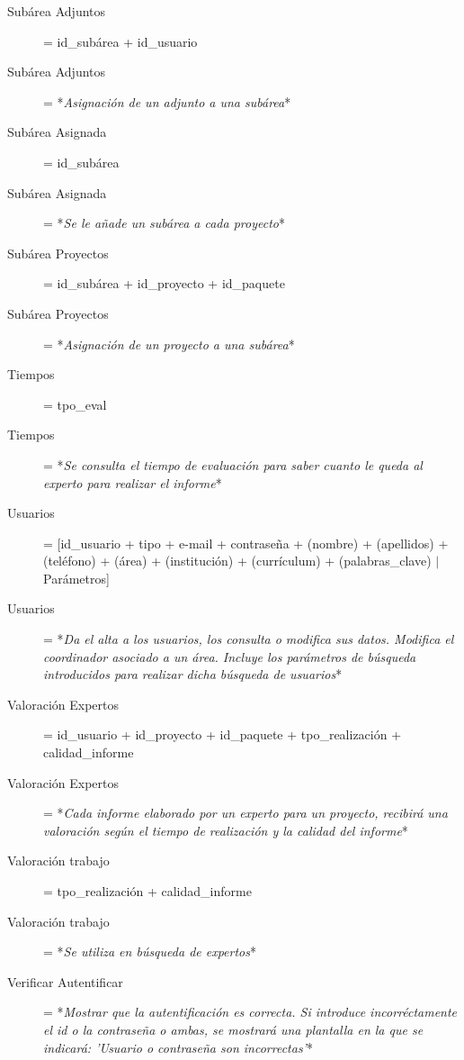 \documentclass[12pt,a4paper,spanish,twoside]{book}
\begin{document}
\begin{description}
\item[Subárea Adjuntos] = id\_subárea + id\_usuario

\item[Subárea Adjuntos] = *\emph{Asignación de un adjunto a una subárea}*

\item[Subárea Asignada] = id\_subárea

\item[Subárea Asignada] = *\emph{Se le añade un subárea a cada proyecto}*

\item[Subárea Proyectos] = id\_subárea + id\_proyecto + id\_paquete

\item[Subárea Proyectos] = *\emph{Asignación de un proyecto a una subárea}*

\item[Tiempos] = tpo\_eval

\item[Tiempos] = *\emph{Se consulta el tiempo de evaluación para saber cuanto
    le queda al experto para realizar el informe}* 

\item[Usuarios] = [id\_usuario + tipo + e-mail + contraseña + (nombre) +
  (apellidos) + (teléfono) + (área) + (institución) + (currículum) +
  (palabras\_clave) $\mid$ Parámetros] 

\item[Usuarios] = *\emph{Da el alta a los usuarios, los consulta o modifica
    sus datos. Modifica el coordinador asociado a un área. Incluye los
    parámetros de búsqueda introducidos para realizar dicha búsqueda de
    usuarios}* 

\item[Valoración Expertos] = id\_usuario + id\_proyecto + id\_paquete +
  tpo\_realización + calidad\_informe 

\item[Valoración Expertos] = *\emph{Cada informe elaborado por un experto
    para un proyecto, recibirá una valoración según el tiempo de realización
    y la calidad del informe}* 

\item[Valoración trabajo] = {tpo\_realización + calidad\_informe}

\item[Valoración trabajo] = *\emph{Se utiliza en búsqueda de expertos}*

\item[Verificar Autentificar] = *\emph{Mostrar que la autentificación es
    correcta. Si introduce incorréctamente el id o la contraseña o ambas, se
    mostrará una plantalla en la que se indicará: 'Usuario o contraseña son
    incorrectas'}* 
\end{description}
\end{document}
